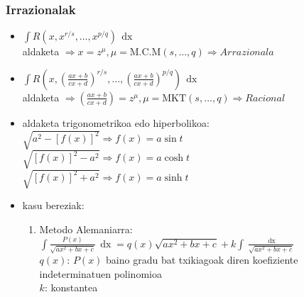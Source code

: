 \documentclass[8pt]{article}
\DeclareMathOperator{\xder}{\, \mathrm{d}x}
\begin{document}
		\subsubsection{Irrazionalak}
			\begin{itemize}
				\item $ \int R (x, x^{r/s}, \dots , x^{p/q}) \xder $\\
					aldaketa $ \Rightarrow x = z^{\mu},
					\mu = \text{M.C.M} (s, \dots, q) \Rightarrow Arrazionala $
				\item $ \int R (x, (\frac{ax+b}{cx+d})^{r/s}, \dots, 
					(\frac{ax+b}{cx+d})^{p/q}) \xder $\\
					aldaketa $ \Rightarrow (\frac{ax+b}{cx+d}) = z^{\mu},
					\mu = \text{MKT} (s, \dots, q) \Rightarrow Racional $
				\item aldaketa trigonometrikoa edo hiperbolikoa:\\
					$ \sqrt{a^2 - [f(x)]^2} \Rightarrow f(x) = a \sin t $\\
					$ \sqrt{[f(x)]^2 - a^2} \Rightarrow f(x) = a \cosh t $\\
					$ \sqrt{[f(x)]^2 + a^2} \Rightarrow f(x) = a \sinh t $
				\item kasu bereziak:
					\begin{enumerate}
						\item Metodo Alemaniarra:
							$ \int \frac{P(x)}{\sqrt{a x^2 + bx + c}} \xder =
							q(x) \sqrt{a x^2 + bx + c} + k \int \frac{\xder}{\sqrt{a x^2 + bx + c}} $\\

							$ q(x) $: $ P(x) $ baino gradu bat txikiagoak diren
							koefiziente indeterminatuen polinomioa\\
							$ k $: konstantea
								

\end{enumerate}
\end{itemize}
\end{document}
